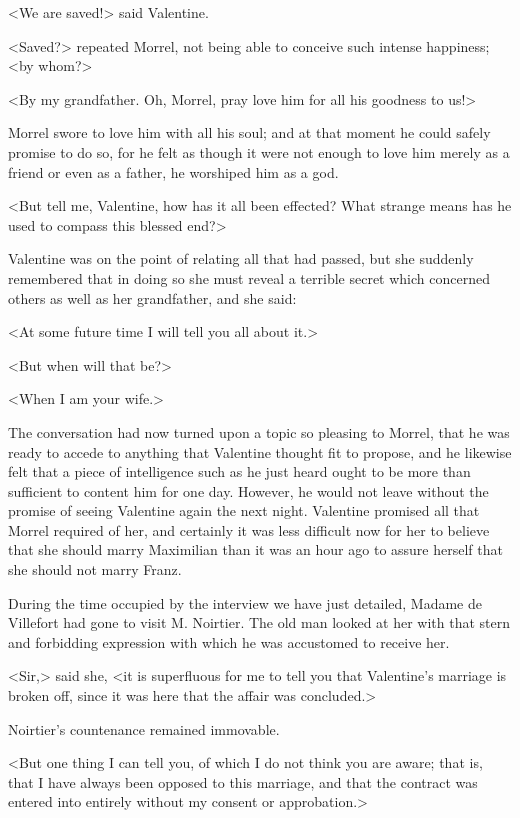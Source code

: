  <We are saved!> said Valentine. 

 <Saved?> repeated Morrel, not being able to conceive such intense happiness; <by whom?> 

 <By my grandfather. Oh, Morrel, pray love him for all his goodness to us!> 

 Morrel swore to love him with all his soul; and at that moment he could safely promise to do so, for he felt as though it were not enough to love him merely as a friend or even as a father, he worshiped him as a god. 

 <But tell me, Valentine, how has it all been effected? What strange means has he used to compass this blessed end?> 

 Valentine was on the point of relating all that had passed, but she suddenly remembered that in doing so she must reveal a terrible secret which concerned others as well as her grandfather, and she said: 

 <At some future time I will tell you all about it.> 

 <But when will that be?> 

 <When I am your wife.> 

 The conversation had now turned upon a topic so pleasing to Morrel, that he was ready to accede to anything that Valentine thought fit to propose, and he likewise felt that a piece of intelligence such as he just heard ought to be more than sufficient to content him for one day. However, he would not leave without the promise of seeing Valentine again the next night. Valentine promised all that Morrel required of her, and certainly it was less difficult now for her to believe that she should marry Maximilian than it was an hour ago to assure herself that she should not marry Franz. 

 During the time occupied by the interview we have just detailed, Madame de Villefort had gone to visit M. Noirtier. The old man looked at her with that stern and forbidding expression with which he was accustomed to receive her. 

 <Sir,> said she, <it is superfluous for me to tell you that Valentine's marriage is broken off, since it was here that the affair was concluded.> 

 Noirtier's countenance remained immovable. 

 <But one thing I can tell you, of which I do not think you are aware; that is, that I have always been opposed to this marriage, and that the contract was entered into entirely without my consent or approbation.> 


